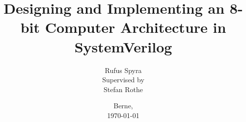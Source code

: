 \documentclass[parskip=full]{scrreprt}
\title{Designing and Implementing an 8-bit Computer Architecture in SystemVerilog}
\author{Rufus Spyra\vspace{1cm}\\
Supervised by \\
Stefan Rothe}
\date{Berne,\\
\today}
\begin{document}
\maketitle

\tableofcontents








\listoffigures
\listoftables
\lstlistoflistings
\printbibliography


\end{document}

